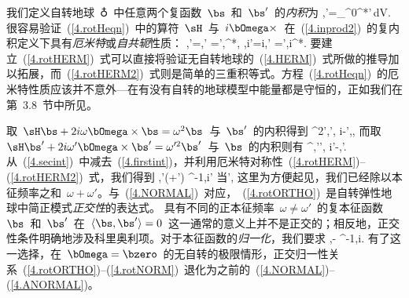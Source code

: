 我们定义自转地球~$\earth$~中任意两个复函数~$\bs$~和~$\bs'$~的{\em 内积\/}为
%
\eq
\label{4.inprod2}
\langle\bs,\bs'\rangle=\int_{\subearth}\rho^0\bs^*\cdot\bs'\,dV.
\en
很容易验证~(\ref{4.rotHeqn})~中的算符~$\sH$~与~$i\bOmega\times$~在~(\ref{4.inprod2})~的复内积定义下具有{\em 厄米特\/}或{\em 自共轭\/}性质：
%
%
%
%
\eq
\label{4.rotHERM}
\langle\bs,\sH\bs'\rangle=\langle\sH\bs,\bs'\rangle
=\langle\bs',\sH\bs\rangle^*,
\en
\eq
\label{4.rotHERM2}
\langle\bs,i\bOmega\times\bs'\rangle=\langle i\bOmega\times\bs,\bs'\rangle
=\langle\bs',i\bOmega\times\bs\rangle^*.
\en
要建立~(\ref{4.rotHERM})~式可以直接将验证无自转地球的~(\ref{4.HERM})~式所做的推导加以拓展，而~(\ref{4.rotHERM2})~式则是简单的三重积等式。方程~(\ref{4.rotHeqn})~的厄米特性质应该并不意外---在有没有自转的地球模型中能量都是守恒的，正如我们在第~3.8~节中所见。

取~$\sH\bs+2i\omega \bOmega\times\bs=\omega^2\bs$~与~$\bs'$~的内积得到
\eq
\label{4.rotnew1}
\label{4.firstint}
\omega^2\langle\bs',\bs{}\omega\langle\bs',
i\bOmega\times\bs\rangle-\langle\bs',\sH\bs{}, 
\en
而取~$\sH\bs'+2i\omega' \bOmega\times\bs'=\omega^{\prime 2}\bs'$~与~$\bs$~的内积则有
\eq
\label{4.secint}
\omega^{}\langle\bs,\bs'\omega'\langle\bs,
i\bOmega\times\bs'\rangle-\langle\bs,\sH\bs'.
\en
从~(\ref{4.secint})~中减去~(\ref{4.firstint})，并利用厄米特对称性~(\ref{4.rotHERM})--(\ref{4.rotHERM2})~式，我们得到
\eq
\label{4.rotORTHO}
\langle\bs,\bs'(\omega+\omega')
^{-1}\langle\bs,i\bOmega\times\bs'
\quad\mbox{当}\quad\omega\neq\omega',
\en
这里为方便起见，我们已经除以本征频率之和~$\omega+\omega'$。与~(\ref{4.NORMAL})~对应，~(\ref{4.rotORTHO})~是自转弹性地球中简正模式{\em 正交性\/}的表达式。
%
具有不同的正本征频率~$\omega\not =\omega'$~的复本征函数~$\bs$~和~$\bs'$~在~$\langle\bs,\bs'\rangle=0$~这一通常的意义上并不是正交的；相反地，正交性条件明确地涉及科里奥利项。对于本征函数的{\em 归一化\/}，我们要求
\eq
\label{4.rotNORM}
\langle\bs,\bs\rangle-\omega
^{-1}\langle\bs,i\bOmega\times\bs{}.
\en
{}%
有了这一选择，在~$\bOmega=\bzero$~的无自转的极限情形，正交归一性关系~(\ref{4.rotORTHO})--(\ref{4.rotNORM})~退化为之前的~(\ref{4.NORMAL})--(\ref{4.ANORMAL})。
%

\renewcommand{\thesubsection}{$\!\!\!\raise1.3ex\hbox{$\star$}\!\!$
\arabic{chapter}.\arabic{section}.\arabic{subsection}}
